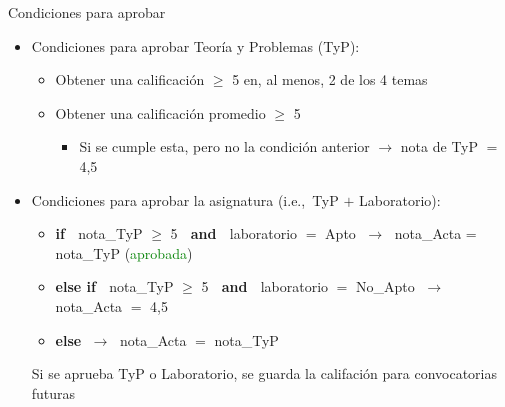 \documentclass[aspectratio=169, usenames,svgnames,dvipsnames]{beamer}
\begin{document}
\begin{frame}{Condiciones para aprobar}
    \begin{itemize}
    \item \alert{Condiciones para aprobar Teoría y Problemas}  (TyP):
        \vspace{1mm}
        \begin{itemize}
        \item {\normalsize Obtener una calificación $\geq$ 5 en, al menos, 2 de los 4 temas}
        \vspace{1mm}
        \item {\normalsize Obtener una calificación promedio $\geq$ 5} 
            \vspace{1mm}
            \begin{itemize}
            \item {\normalsize Si se cumple esta, pero no la condición anterior $\rightarrow$ nota de TyP $=$ 4,5}
            \end{itemize}
        \end{itemize}
    \vspace{3mm}
    \item \alert{Condiciones para aprobar la asignatura} (i.e.,~TyP $+$ Laboratorio):
        \vspace{1mm}
        \begin{itemize}
        \item {\normalsize \textbf{if} $\;$ nota\_TyP $\geq$ 5 $\;$ \textbf{and} $\;$ laboratorio $=$ Apto $\; \rightarrow \;$ nota\_Acta = nota\_TyP} (\textcolor{green}{aprobada})
        
        \vspace{1mm}
        \item {\normalsize \textbf{else if} $\;$ nota\_TyP $\geq$ 5 $\;$ \textbf{and} $\;$ laboratorio $=$ No\_Apto $\; \rightarrow \;$ nota\_Acta $=$ 4,5}
        \vspace{1mm}
        \item {\normalsize \textbf{else} $\; \rightarrow \;$ nota\_Acta $=$ nota\_TyP}
        \end{itemize}
    \vspace{6mm}
    Si se aprueba TyP o Laboratorio, se guarda la califación para convocatorias futuras
    \end{itemize}

\end{frame}
\end{document}

